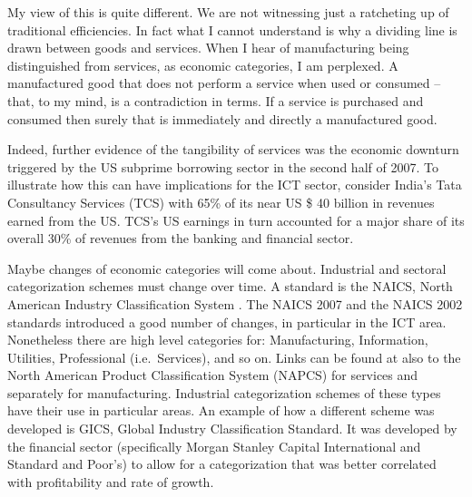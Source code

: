 \documentclass{article}
\begin{document}
My view of this is quite different.  We are not witnessing  
just a ratcheting up 
of traditional efficiencies.  In fact what I cannot understand
is why a dividing line is drawn between goods and services.  When I 
hear of manufacturing being distinguished from services, as economic
categories, I am perplexed.  A manufactured good that does not 
perform a service when used or consumed -- that, to my mind, is a 
contradiction in terms.    If a service is purchased and 
consumed then surely that is immediately and directly a manufactured 
good.  

Indeed, further evidence of the tangibility of services was the
economic downturn triggered by the US subprime borrowing sector in 
the second half of 2007.  To illustrate how this can have 
implications for the ICT sector, consider 
 India's Tata Consultancy Services (TCS) \cite{tata}
with 65\% of its near US \$ 40 billion in revenues earned from the US. 
TCS's US earnings in turn accounted for a major share of its overall 
30\% of revenues from the banking and financial sector.  

Maybe changes of economic categories will come about.  
Industrial and sectoral categorization schemes must change over time.  
A standard is the NAICS, North American Industry Classification System
\cite{naics}.  The NAICS 2007 and the NAICS 2002 standards introduced a 
good number of changes, in particular in the ICT area.  Nonetheless 
there are high level categories for: Manufacturing, Information, 
Utilities, Professional (i.e.\ Services), and so on.  Links can be 
found at \cite{naics} also to the  North American Product Classification 
System (NAPCS) for services and separately for manufacturing.  
Industrial categorization schemes of these types have their use in 
particular areas.  An example of how a different scheme was developed 
is GICS, Global Industry Classification Standard.  It was developed 
by the financial sector (specifically Morgan Stanley Capital 
International and Standard and Poor's) to allow for a categorization 
that was better correlated with profitability and rate of growth.  
\end{document}
